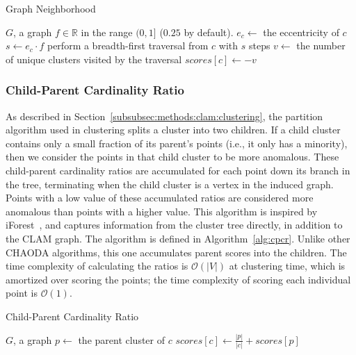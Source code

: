 \begin{algorithm}[h]
    \caption{Graph Neighborhood}
    \label{alg:gns}
\begin{algorithmic}[1]
    \REQUIRE $G$, a graph
    \REQUIRE $f \in \mathbb{R}$ in the range $(0,1]$ ($0.25$ by default).
        \STATE $e_c \gets$ the eccentricity of $c$
        \STATE $s \gets e_c \cdot f$
        \STATE perform a breadth-first traversal from $c$ with $s$ steps
        \STATE $v \gets$ the number of unique clusters visited by the traversal
        \STATE $scores[c] \gets -v$
    \ENDFOR
\end{algorithmic}
\end{algorithm}


\subsubsection{Child-Parent Cardinality Ratio}
\label{subsubsec:methods:individual-algorithms:cpcr}
As described in Section~\ref{subsubsec:methods:clam:clustering}, the partition algorithm used in clustering splits a cluster into two children.
If a child cluster contains only a small fraction of its parent's points (i.e., it only has a minority), then we consider the points in that child cluster to be more anomalous.
These child-parent cardinality ratios are accumulated for each point down its branch in the tree, terminating when the child cluster is a vertex in the induced graph.
Points with a low value of these accumulated ratios are considered more anomalous than points with a higher value.
This algorithm is inspired by iForest~\cite{tony2008iforest}, and captures information from the cluster tree directly, in addition to the CLAM graph.
The algorithm is defined in Algorithm~\ref{alg:cpcr}.
Unlike other CHAODA algorithms, this one accumulates parent scores into the children.
The time complexity of calculating the ratios is $\mathcal{O}(|V|)$ at clustering time, which is amortized over scoring the points;
the time complexity of scoring each individual point is $\mathcal{O}(1)$.

\begin{algorithm}[h]
    \caption{Child-Parent Cardinality Ratio}
    \label{alg:cpcr}
\begin{algorithmic}[1]
    \REQUIRE $G$, a graph
        \STATE $p \gets$ the parent cluster of $c$
        \STATE $scores[c] \gets \frac{|p|}{|c|} + scores[p]$
    \ENDFOR
\end{algorithmic}
\end{algorithm}



